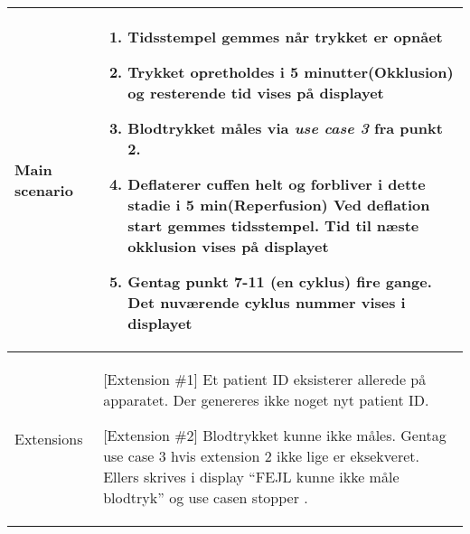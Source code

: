 \begin{center}
\begin{longtable}{ | m{4cm} | m{8cm}| }
			\hline
			Main scenario & \begin{enumerate}
				\setlength\itemsep{0cm} %
				\setcounter{enumi}{7}				
				\item Tidsstempel gemmes når trykket er opnået
				\item Trykket opretholdes i 5 minutter(Okklusion) og resterende tid vises på displayet
				\item Blodtrykket måles via \textit{use case 3}
				fra punkt 2.
				\item Deflaterer cuffen helt og forbliver i dette stadie i 5 min(Reperfusion) Ved deflation start gemmes tidsstempel. Tid til næste okklusion vises på displayet
				\item Gentag punkt 7-11 (en cyklus) fire gange. Det nuværende cyklus nummer vises i displayet
			\end{enumerate} \\ 
			\hline
			Extensions & [Extension \#1] Et patient ID eksisterer allerede på apparatet. Der genereres ikke noget nyt patient ID.
			
			[Extension \#2] Blodtrykket kunne ikke måles. Gentag use case 3 hvis extension 2 ikke lige er eksekveret. Ellers skrives i display “FEJL kunne ikke måle blodtryk” og use casen stopper    .  \\
			\hline
		\end{longtable}
		
	\end{center}
	\pagebreak